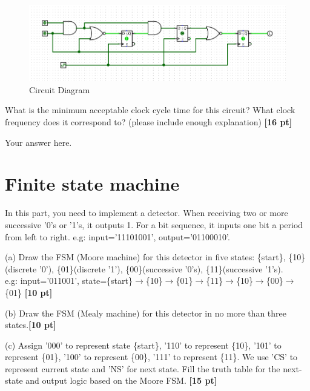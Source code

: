 \documentclass[a4paper]{article}
\begin{document}
\begin{figure}[hp]
    \centering
    \includegraphics[width=1.0\textwidth]{Q2.png}
    \caption{Circuit Diagram}
    \label{fig:q2}
\end{figure}

What is the minimum acceptable clock cycle time for this circuit? What
clock frequency does it correspond to? (please include enough explanation) \textbf{[16 pt]}

\begin{answer}[Question 2]
    Your answer here. \\
\end{answer}

\newpage
\section{Finite state machine}
In this part, you need to implement a detector. When receiving two or more successive '0's or '1's, it outputs 1. For a bit sequence, it inputs one bit a period from left to right. e.g: input='11101001', output='01100010'.

(a) Draw the FSM (Moore machine) for this detector in five states: \{start\}, \{10\}(discrete '0'), \{01\}(discrete '1'), \{00\}(successive '0's), \{11\}(successive '1's). \\
e.g: input='011001', state=\{start\}$\xrightarrow{}$\{10\}$\xrightarrow{}$\{01\}$\xrightarrow{}$\{11\}$\xrightarrow{}$\{10\}$\xrightarrow{}$\{00\}$\xrightarrow{}$\{01\} \textbf{[10 pt]}

(b) Draw the FSM (Mealy machine) for this detector in no more than three states.\textbf{[10 pt]}

(c) Assign '000' to represent state \{start\}, '110' to represent \{10\}, '101' to represent \{01\}, '100' to represent \{00\}, '111' to represent \{11\}. We use 'CS' to represent current state and 'NS' for next state. Fill the truth table for the next-state and output logic based on the Moore FSM. \textbf{[15 pt]}
\end{document}
